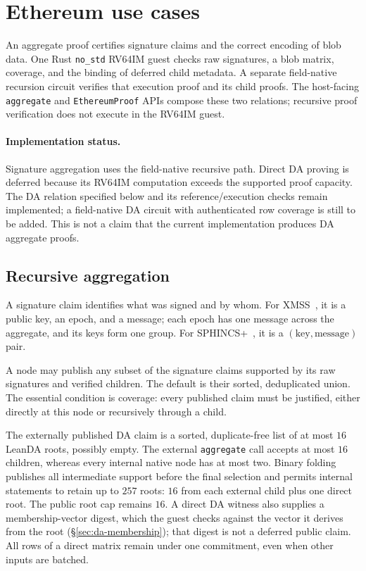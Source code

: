 \section{Ethereum use cases}\label{sec:ethereum}

An aggregate proof certifies signature claims and the correct encoding of blob data. One Rust \texttt{no\_std} RV64IM guest checks raw signatures, a blob matrix, coverage, and the binding of deferred child metadata. A separate field-native recursion circuit verifies that execution proof and its child proofs. The host-facing \texttt{aggregate} and \texttt{EthereumProof} APIs compose these two relations; recursive proof verification does not execute in the RV64IM guest.

\paragraph{Implementation status.} Signature aggregation uses the field-native recursive path. Direct DA proving is deferred because its RV64IM computation exceeds the supported proof capacity. The DA relation specified below and its reference/execution checks remain implemented; a field-native DA circuit with authenticated row coverage is still to be added. This is not a claim that the current implementation produces DA aggregate proofs.

\subsection{Recursive aggregation}\label{sec:recursion}\label{sec:xmss-agg}\label{sec:sphincs-agg}

A signature claim identifies what was signed and by whom. For XMSS~\cite{rfc8391}, it is a public key, an epoch, and a message; each epoch has one message across the aggregate, and its keys form one group. For SPHINCS+~\cite{sphincs}, it is a $(\text{key},\text{message})$ pair.

A node may publish any subset of the signature claims supported by its raw signatures and verified children. The default is their sorted, deduplicated union. The essential condition is coverage: every published claim must be justified, either directly at this node or recursively through a child.

The externally published DA claim is a sorted, duplicate-free list of at most $16$ LeanDA roots, possibly empty. The external \texttt{aggregate} call accepts at most $16$ children, whereas every internal native node has at most two. Binary folding publishes all intermediate support before the final selection and permits internal statements to retain up to $257$ roots: $16$ from each external child plus one direct root. The public root cap remains $16$. A direct DA witness also supplies a membership-vector digest, which the guest checks against the vector it derives from the root (\S\ref{sec:da-membership}); that digest is not a deferred public claim. All rows of a direct matrix remain under one commitment, even when other inputs are batched.

